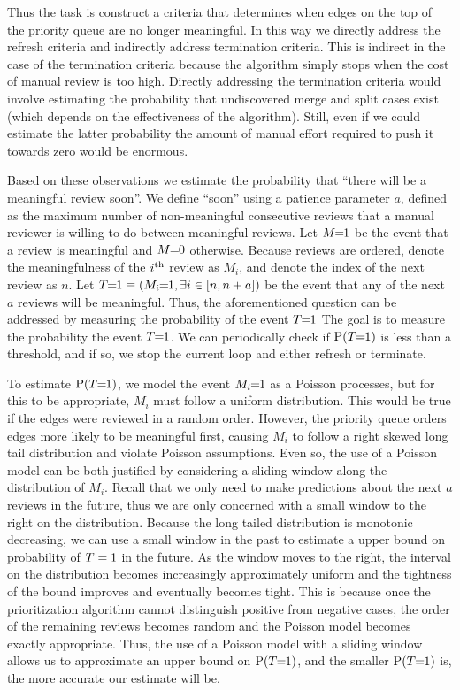 Thus the task is construct a criteria that determines when edges on the top of the priority queue are no longer
  meaningful.
In this way we directly address the refresh criteria and indirectly address termination criteria.
This is indirect in the case of the termination criteria because the algorithm simply stops when the cost of
  manual review is too high.
Directly addressing the termination criteria would involve estimating the probability that undiscovered merge and
  split cases exist (which depends on the effectiveness of the algorithm).
Still, even if we could estimate the latter probability the amount of manual effort required to push it towards
  zero would be enormous.



Based on these observations we estimate the probability that ``there will be a meaningful review soon''.
We define ``soon'' using a patience parameter $a$, defined as the maximum number of non-meaningful consecutive
  reviews that a manual reviewer is willing to do between meaningful reviews.
Let $M\mkern-6mu=\mkern-6mu1$ be the event that a review is meaningful and $M\mkern-6mu=\mkern-6mu0$ otherwise.
Because reviews are ordered, denote the meaningfulness of the $i^{\textrm{th}}$ review as $M_i$, and denote the index of the
  next review as $n$.
Let $T\mkern-6mu=\mkern-6mu1 \equiv (M_i\mkern-6mu=\mkern-6mu1, \exists i \in [n, n + a])$ be the event that any of the next $a$ reviews will be
  meaningful.
Thus, the aforementioned question can be addressed by measuring the probability of the event $T\mkern-6mu=\mkern-6mu1$ The goal is
  to measure the probability the event $T\mkern-6mu=\mkern-6mu1$.
We can periodically check if $\mathbin{\operatorname{P}}(T\mkern-6mu=\mkern-6mu1)$ is less than a threshold, and if so, we stop the current loop and
  either refresh or terminate.

To estimate $\mathbin{\operatorname{P}}(T\mkern-6mu=\mkern-6mu1)$, we model the event $M_i\mkern-6mu=\mkern-6mu1$ as a Poisson processes, but for this to be appropriate,
  $M_i$ must follow a uniform distribution.
This would be true if the edges were reviewed in a random order.
However, the priority queue orders edges more likely to be meaningful first, causing $M_i$ to follow a right
  skewed long tail distribution and violate Poisson assumptions.
Even so, the use of a Poisson model can be both justified by considering a sliding window along the distribution
  of $M_i$.
Recall that we only need to make predictions about the next $a$ reviews in the future, thus we are only concerned
  with a small window to the right on the distribution.
Because the long tailed distribution is monotonic decreasing, we can use a small window in the past to estimate a
  upper bound on probability of $T=1$ in the future.
As the window moves to the right, the interval on the distribution becomes increasingly approximately uniform and
  the tightness of the bound improves and eventually becomes tight.
This is because once the prioritization algorithm cannot distinguish positive from negative cases, the order of
  the remaining reviews becomes random and the Poisson model becomes exactly appropriate.
Thus, the use of a Poisson model with a sliding window allows us to approximate an upper bound on $\mathbin{\operatorname{P}}(T\mkern-6mu=\mkern-6mu1)$,
  and the smaller $\mathbin{\operatorname{P}}(T\mkern-6mu=\mkern-6mu1)$ is, the more accurate our estimate will be.


